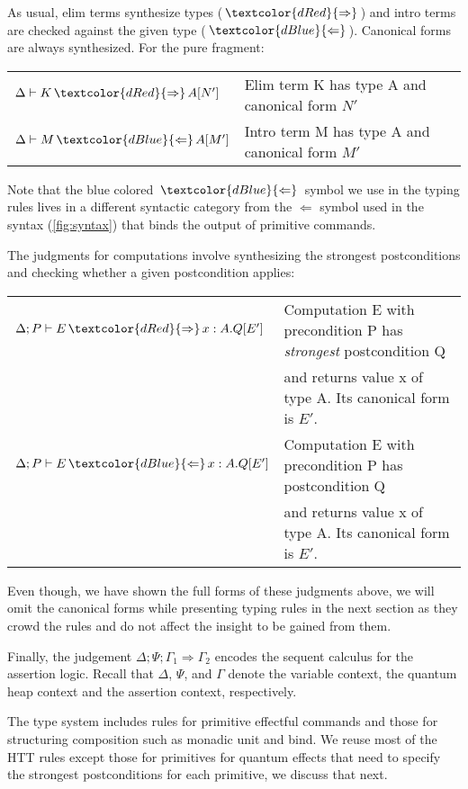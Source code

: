 \documentclass[acmsmall,nonacm,timestamp,review=false,anonymous=false]{acmart}
\newcommand{\chkcolor}{dBlue}
\newcommand{\syncolor}{dRed}
\newcommand{\chk}{\,\textcolor{\chkcolor}{\Leftarrow}\,}
\newcommand{\uncoloredsyn}{{\Rightarrow}}
\newcommand{\syn}{\,\textcolor{\syncolor}{\uncoloredsyn}\,}
\begin{document}
As usual, elim terms synthesize types ($\syn$) and intro terms are checked against the given type ($\chk$). Canonical forms are always synthesized. For the pure fragment:

\begin{center}
	\begin{tabular}{ll}
		$\Delta \vdash K \syn A [N']$ & Elim term K has type A and canonical form $N'$ \\
		$\Delta \vdash M \chk A [M']$ & Intro term M has type A and canonical form $M'$
	\end{tabular}
\end{center}

Note that the blue colored $\chk$ symbol we use in the typing rules lives in a different syntactic category from the $\Leftarrow$ symbol used in the syntax (\cref{fig:syntax}) that binds the output of primitive commands.

The judgments for computations involve synthesizing the strongest postconditions and checking whether a given postcondition applies:

\begin{center}
	\begin{tabular}{ll}
		$\Delta; P \vdash E \syn x:A.Q[E']$ & Computation E with precondition P has \textit{strongest} postcondition Q\\ & and returns value x of type A. Its canonical form is $E'$. \\
		$\Delta; P \vdash E \chk x:A.Q[E']$ & Computation E with precondition P has postcondition Q\\ & and returns value x of type A. Its canonical form is $E'$.
	\end{tabular}
\end{center}

Even though, we have shown the full forms of these judgments above, we will omit the canonical forms while presenting typing rules in the next section as they crowd the rules and do not affect the insight to be gained from them.

Finally, the judgement $\Delta; \Psi; \Gamma_1 \Longrightarrow \Gamma_2$ encodes the sequent calculus for the assertion logic. Recall that $\Delta$, $\Psi$, and $\Gamma$ denote the variable context, the quantum heap context and the assertion context, respectively.

The type system includes rules for primitive effectful commands and those for structuring composition such as monadic unit and bind. We reuse most of the HTT rules except those for primitives for quantum effects that need to specify the strongest postconditions for each primitive, we discuss that next.
\end{document}
